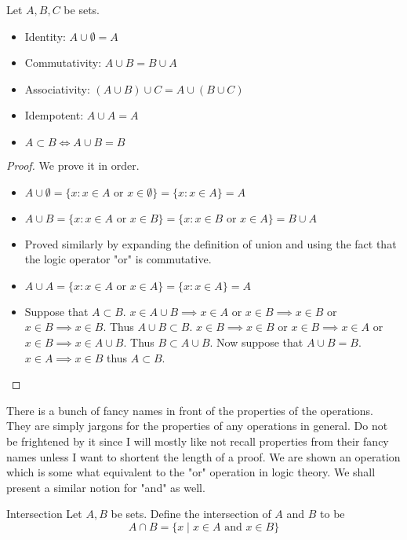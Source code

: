 \documentclass[a4paper]{article}
\begin{document}
\begin{prp}{}{} Let $A,B,C$ be sets. 
\begin{itemize}
\item Identity: $A\cup\emptyset=A$
\item Commutativity: $A\cup B=B\cup A$
\item Associativity: $(A\cup B)\cup C=A\cup(B\cup C)$
\item Idempotent: $A\cup A=A$
\item $A\subset B\iff A\cup B=B$
\end{itemize}\tcbline
\begin{proof} We prove it in order. 
\begin{itemize}
\item $A\cup\emptyset=\{x:x\in A\text{ or }x\in\emptyset\}=\{x:x\in A\}=A$
\item $A\cup B=\{x:x\in A\text{ or }x\in B\}=\{x:x\in B\text{ or }x\in A\}=B\cup A$
\item Proved similarly by expanding the definition of union and using the fact that the logic operator "or" is commutative. 
\item $A\cup A=\{x:x\in A\text{ or }x\in A\}=\{x:x\in A\}=A$
\item Suppose that $A\subset B$. $x\in A\cup B\implies x\in A$ or $x\in B\implies x\in B$ or $x\in B\implies x\in B$. Thus $A\cup B\subset B$. $x\in B\implies x\in B$ or $x\in B\implies x\in A$ or $x\in B\implies x\in A\cup B$. Thus $B\subset A\cup B$. Now suppose that $A\cup B=B$. $x\in A\implies x\in B$ thus $A\subset B$. 
\end{itemize}
\end{proof}
\end{prp}

There is a bunch of fancy names in front of the properties of the operations. They are simply jargons for the properties of any operations in general. Do not be frightened by it since I will mostly like not recall properties from their fancy names unless I want to shortent the length of a proof. \linebreak\linebreak
We are shown an operation which is some what equivalent to the "or" operation in logic theory. We shall present a similar notion for "and" as well. 

\begin{defn}{Intersection}{} Let $A,B$ be sets. Define the intersection of $A$ and $B$ to be $$A\cap B=\{x\;|\;x\in A\text{ and }x\in B\}$$
\end{defn}
\end{document}
